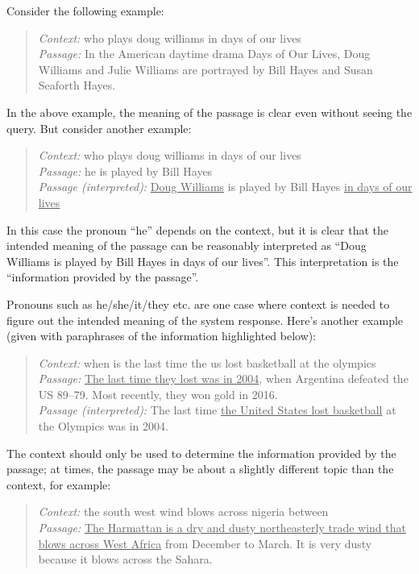 Consider the following example:

\begin{quote}
\textit{Context:} who plays doug williams in days of our lives \\
\textit{Passage:} In the American daytime drama Days of Our Lives, Doug Williams and Julie Williams are portrayed by Bill Hayes and Susan Seaforth Hayes. \\
\end{quote}

In the above example, the meaning of the passage is clear even without seeing the query. But consider another example:

\begin{quote}
\textit{Context:} who plays doug williams in days of our lives \\
\textit{Passage:} he is played by Bill Hayes \\
\textit{Passage (interpreted):} \ul{Doug Williams} is played by Bill Hayes \ul{in days of our lives}
\end{quote}

In this case the pronoun ``he'' depends on the context, but it is clear that the  intended meaning of the passage can be reasonably interpreted as ``Doug Williams is played by Bill Hayes in days of our lives''. This interpretation is the ``information provided by the passage''. 

Pronouns such as he/she/it/they etc. are one case where context is needed to figure out the intended meaning of the system response. Here's another example (given with paraphrases of the information highlighted below):

\begin{quote}
\textit{Context:} when is the last time the us lost basketball at the olympics \\
\textit{Passage:} \ul{The last time they lost was in 2004}, when Argentina defeated the US 89–79. Most recently, they won gold in 2016. \\
\textit{Passage (interpreted):} The last time \ul{the United States lost basketball} at the Olympics was in 2004.
\end{quote}

The context should only be used to determine the information provided by the passage; at times, the passage may be about a slightly different topic than the context, for example:

\begin{quote}
\textit{Context:} the south west wind blows across nigeria between \\
\textit{Passage:} \ul{The Harmattan is a dry and dusty northeasterly trade wind that blows across West Africa} from December to March. It is very dusty because it blows across the Sahara.
\end{quote}

